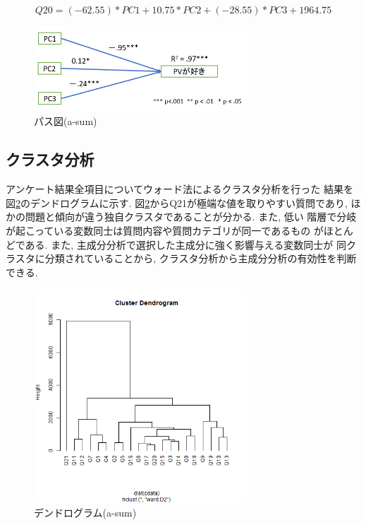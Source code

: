 \documentclass[12pt, a4j]{jsarticle}
\begin{document}
      \begin{equation}
        Q20 = (-62.55) * PC1 + 10.75 * PC2 + (-28.55) * PC3 + 1964.75
        \label{eq:asum}
      \end{equation}

      \begin{figure}
        \centering
        \includegraphics[width=8cm]{../2nd/a-sum/path.png}
        \caption{パス図(a-sum)}
        \label{fig:asum_path}
      \end{figure}
    \subsection{クラスタ分析}
      アンケート結果全項目についてウォード法によるクラスタ分析を行った
      結果を図\ref{fig:asum_dendrogram}のデンドログラムに示す. 
      図\ref{fig:asum_dendrogram}からQ21が極端な値を取りやすい質問であり, 
      ほかの問題と傾向が違う独自クラスタであることが分かる. また, 低い
      階層で分岐が起こっている変数同士は質問内容や質問カテゴリが同一であるもの
      がほとんどである. また, 主成分分析で選択した主成分に強く影響与える変数同士が
      同クラスタに分類されていることから, クラスタ分析から主成分分析の有効性を判断できる. 

      \begin{figure}[htb]
        \centering
        \includegraphics[width=8cm]{../2nd/a-sum/cluster.bmp}
        \caption{デンドログラム(a-sum)}
        \label{fig:asum_dendrogram}
      \end{figure}
\end{document}
